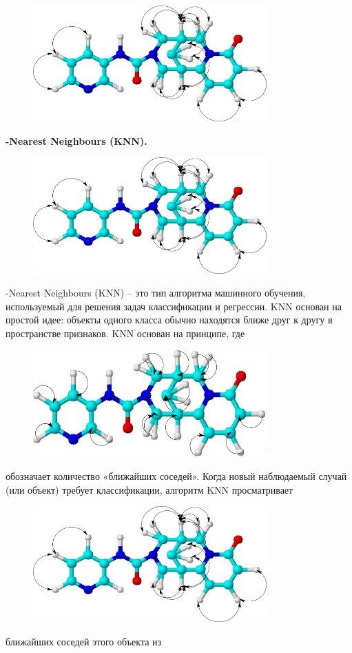 \begin{figure}[H]
	\centering
	\includegraphics[width=0.8\textwidth]{assets/11}
	\caption*{}
\end{figure}{\bfseries -Nearest Neighbours (KNN).}
\begin{figure}[H]
	\centering
	\includegraphics[width=0.8\textwidth]{assets/11}
	\caption*{}
\end{figure}-Nearest Neighbours (KNN) -- это тип
алгоритма машинного обучения, используемый для решения задач
классификации и регрессии. KNN основан на простой идее: объекты одного
класса обычно находятся ближе друг к другу в пространстве признаков. KNN
основан на принципе, где \begin{figure}[H]
	\centering
	\includegraphics[width=0.8\textwidth]{assets/12}
	\caption*{}
\end{figure} обозначает
количество «ближайших соседей». Когда новый наблюдаемый случай (или
объект) требует классификации, алгоритм KNN просматривает
\begin{figure}[H]
	\centering
	\includegraphics[width=0.8\textwidth]{assets/11}
	\caption*{}
\end{figure} ближайших соседей этого объекта из
